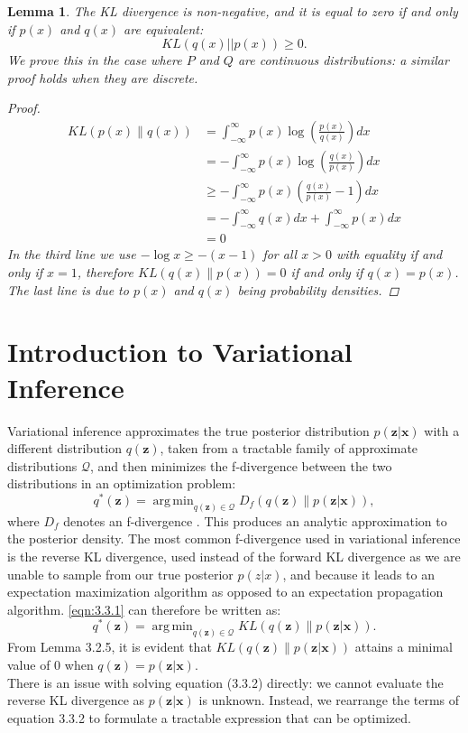 \documentclass[honours,12pt]{unswthesis}
\DeclareMathOperator*{\argmin}{arg\,min}
\newtheorem{lemma}[theorem]{Lemma}
\numberwithin{equation}{section}
\theoremstyle{definition}
\begin{document}
\begin{lemma}\label{lemma:3.2.5}
The KL divergence is non-negative, and it is equal to zero if and only if $p(x)$ and $q(x)$ are equivalent:
\begin{equation*}
KL(q(x)||p(x))\geq 0.
\end{equation*}
We prove this in the case where $P$ and $Q$ are continuous distributions: a similar proof holds when they are discrete.
\begin{proof}
\begin{align*}
KL(p(x)\|q(x))&=\int_{-\infty}^\infty p(x)\log \left(\frac{p(x)}{q(x)}\right)dx\\
&=-\int_{-\infty}^\infty p(x)\log \left(\frac{q(x)}{p(x)}\right)dx\\
&\geq -\int_{-\infty}^\infty p(x) \left(\frac{q(x)}{p(x)}-1\right)dx\\
&=-\int_{-\infty}^\infty q(x)dx + \int_{-\infty}^\infty p(x)dx\\
&=0
\end{align*}
In the third line we use $-\log x \geq -(x-1)$ for all $x>0$ with equality if and only if $x=1$, therefore $KL(q(x)\|p(x))=0$ if and only if $q(x)=p(x)$. The last line is due to $p(x)$ and $q(x)$ being probability densities.
\end{proof}
\end{lemma}
\section{Introduction to Variational Inference}
Variational inference approximates the true posterior distribution $p(\bm{z}|\bm{x})$ with a different distribution $q(\bm{z})$, taken from a tractable family of approximate distributions $\mathcal{Q}$, and then minimizes the f-divergence between the two distributions in an optimization problem:
\begin{equation}\label{eqn:3.3.1}
q^*(\bm{z})=\argmin_{q(\bm{z})\in \mathcal{Q}}D_f(q(\bm{z})\|p(\bm{z}|\bm{x})),
\end{equation} where $D_f$ denotes an f-divergence \citep{blei}. This produces an analytic approximation to the posterior density. The most common f-divergence used in variational inference is the reverse KL divergence, used instead of the forward KL divergence as we are unable to sample from our true posterior $p(z|x)$, and because it leads to an expectation maximization algorithm as opposed to an expectation propagation algorithm. \autoref{eqn:3.3.1} can therefore be written as:
\begin{equation}\label{3.3.2}
q^*(\bm{z})=\argmin_{q(\bm{z})\in \mathcal{Q}}KL(q(\bm{z})\|p(\bm{z}|\bm{x})).
\end{equation}
From Lemma 3.2.5, it is evident that $KL(q(\bm{z})\|p(\bm{z}|\bm{x}))$ attains a minimal value of $0$ when $q(\bm{z})=p(\bm{z}|\bm{x})$.\\
There is an issue with solving equation (3.3.2) directly: we cannot evaluate the reverse KL divergence as $p(\bm{z}|\bm{x})$ is unknown. Instead, we rearrange the terms of equation 3.3.2 to formulate a tractable expression that can be optimized.
\end{document}
